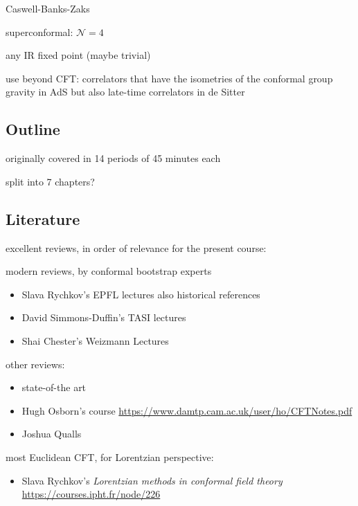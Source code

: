 \documentclass[a4paper,12pt]{article}
\numberwithin{equation}{section}
\begin{document}
Caswell-Banks-Zaks

superconformal: $\mathcal{N} = 4$


any IR fixed point (maybe trivial)


use beyond CFT:
correlators that have the isometries of the conformal group
gravity in AdS
but also late-time correlators in de Sitter

\subsection{Outline}

originally covered in 14 periods of 45 minutes each

split into 7 chapters?


\subsection{Literature}


excellent reviews, in order of relevance for the present course:


modern reviews, by conformal bootstrap experts
\begin{itemize}

\item
Slava Rychkov's EPFL lectures
\cite{Rychkov:2016iqz}
also historical references

\item
David Simmons-Duffin's TASI lectures
\cite{Simmons-Duffin:2016gjk}

\item
Shai Chester's Weizmann Lectures
\cite{Chester:2019wfx}


\end{itemize}


other reviews:

\begin{itemize}

\item
state-of-the art
\cite{Poland:2018epd}

\item
Hugh Osborn's course 
\url{https://www.damtp.cam.ac.uk/user/ho/CFTNotes.pdf}

\item
Joshua Qualls \cite{Qualls:2015qjb}

\end{itemize}


most Euclidean CFT, for Lorentzian perspective:
\begin{itemize}

\item
Slava Rychkov's \emph{Lorentzian methods in conformal field theory}
\url{https://courses.ipht.fr/node/226}


\end{itemize}
\end{document}
